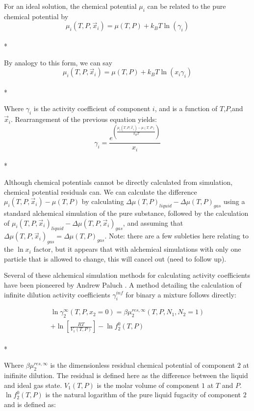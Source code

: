 \documentclass[aps,pre,twocolumn,nofootinbib,superscriptaddress,linenumbers,10pt, draft,tightenlines]{revtex4-1}
\begin{document}
For an ideal solution, the chemical potential $\mu_i$ can be related to the pure chemical potential by 
\begin{equation}\mu_{i}(T,P,\vec{x}_i) = \mu(T,P) + k_B T \ln\left(\gamma_i\right)\end{equation}\\*

By analogy to this form, we can say 
\begin{equation}\mu_{i}(T,P,\vec{x}_i) = \mu(T,P) + k_B T \ln\left(x_i \gamma_i\right)\end{equation}\\*

Where $\gamma_i$ is the activity coefficient of component $i$, and is
a function of $T$,$P$,and $\vec{x}_i$.  Rearrangement of the previous
equation yields:
\begin{equation}\gamma_i = \frac{e^{\left(\frac{\mu_i(T,P,\vec{x}_i) - \mu(T,P)}{k_B T}\right)}}{x_i}\end{equation}\\*

Although chemical potentials cannot be directly calculated from
simulation, chemical potential residuals can. We can calculate the
difference $\mu_i(T,P,\vec{x}_i) - \mu(T,P)$ by calculating $\Delta
\mu(T,P)_{liquid} - \Delta \mu(T,P)_{gas}$ using a standard alchemical
simulation of the pure substance, followed by the calculation of
$\mu_i(T,P,\vec{x}_i)_{liquid} - \Delta \mu(T,P,\vec{x}_i)_{gas}$, and
assuming that $\Delta \mu(T,P,\vec{x}_i)_{gas} = \Delta
\mu(T,P)_{gas}$. Note: there are a few subleties here relating to the
$\ln x_i$ factor, but it appears that with alchemical simulations with
only one particle that is allowed to change, this will cancel out
(need to follow up).

Several of these alchemical simulation methods for calculating activity coefficients have been pioneered by Andrew Paluch \cite{paluch1}. A method detailing the calculation of infinite dilution activity coefficients $\gamma_i^{inf}$ for binary a mixture follows directly:

\begin{multline}
\ln\gamma_2^{\infty}\left(T,P,x_2 = 0\right) = \beta \mu_2^{res,\infty}\left(T,P,N_1,N_2 = 1\right) \\ + \ln\left[\frac{R T}{V_1\left(T,P\right)}\right] - \ln f_2^0\left(T,P\right)
\end{multline}\\*

Where $\beta\mu_2^{res,\infty}$ is the dimensionless residual chemical potential of component $2$ at inifinite dilution. The residual is defined here as the difference between the liquid and ideal gas state. $V_1\left(T,P\right)$ is the molar volume of component $1$ at $T$ and $P$. $\ln f_2^0\left(T,P\right)$ is the natural logarithm of the pure liquid fugacity of component $2$ and is defined as:
\end{document}
